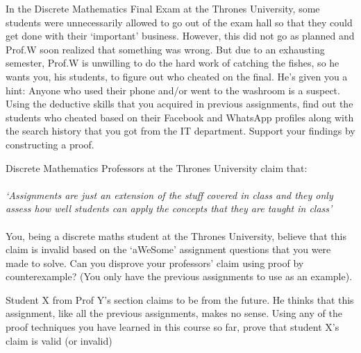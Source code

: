 \documentclass[addpoints]{exam}
\begin{document}
\begin{questions}
		\begin{solution}
			
		\end{solution}
		
		
		\question
		In the Discrete Mathematics Final Exam at the Thrones University, some students were unnecessarily allowed to go out of the exam hall so that they could get done with their `important' business. However, this did not go as planned and Prof.W soon realized that something was wrong. But due to an exhausting semester, Prof.W is unwilling to do the hard work of catching the fishes, so he wants you, his students, to figure out who cheated on the final. He's given you a hint: Anyone who used their phone and/or went to the washroom is a suspect. \\ 
		
		Using the deductive skills that you acquired in previous assignments, find out the students who cheated based on their Facebook and WhatsApp profiles along with the search history that you got from the IT department. Support your findings by constructing a proof.
		\begin{solution}
			
		\end{solution}
		
		
		\question
		Discrete Mathematics Professors at the Thrones University claim that: \\ \\ 
		\textit{`Assignments are just an extension of the stuff covered in class and they only assess how well students can apply the concepts that they are taught in class'} \\ \\
		You, being a discrete maths student at the Thrones University, believe that this claim is invalid based on the `aWeSome' assignment questions that you were made to solve. Can you disprove your professors' claim using proof by counterexample? (You only have the previous assignments to use as an example). 
		\begin{solution}
			
		\end{solution}
		
		\question 
		Student X from Prof Y's section claims to be from the future. He thinks that this assignment, like all the previous assignments, makes no sense. Using any of the proof techniques you have learned in this course so far, prove that student X's claim is valid (or invalid)
		
		\begin{solution}
		\end{solution}
		
		
	\end{questions}
	
	
\end{document}
